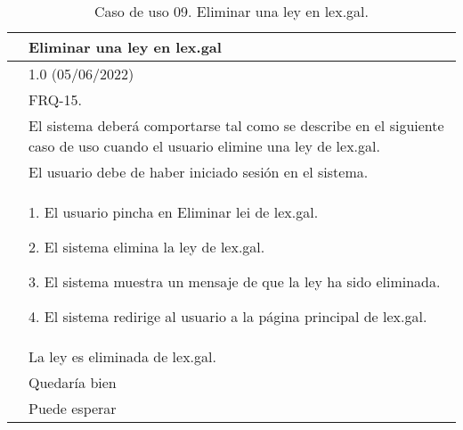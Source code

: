 \begin{table}[H]
\begin{center}
\begin{tabular}{|p{3cm}|p{10cm}|} \hline
\centering {\bf UC-09} & Eliminar una ley en lex.gal  \\ \hline\hline
\centering {\bf Versión} & 1.0 (05/06/2022) \\ \hline
\centering {\bf Dependencias} &  FRQ-15. \\ \hline
\centering {\bf Descripción} &  El sistema deberá comportarse tal como se describe en el siguiente caso de uso cuando el usuario elimine una ley de lex.gal. \\ \hline
\centering {\bf Precondición} &  El usuario debe de haber iniciado sesión en el sistema. \\ \hline
\centering {\bf Secuencia normal} &  
1. El usuario pincha en Eliminar lei de lex.gal.

2. El sistema elimina la ley de lex.gal.

3. El sistema muestra un mensaje de que la ley ha sido eliminada.

4. El sistema redirige al usuario a la página principal de lex.gal.
\\ \hline
\centering {\bf Postcondición} &  La ley es eliminada de lex.gal. \\ \hline
\centering {\bf Importancia} & Quedaría bien \\ \hline
\centering {\bf Urgencia} & Puede esperar \\ \hline
\end{tabular}
\caption{Caso de uso 09. Eliminar una ley en lex.gal.}
\label{enlaceUC9}
\end{center}
\end{table}